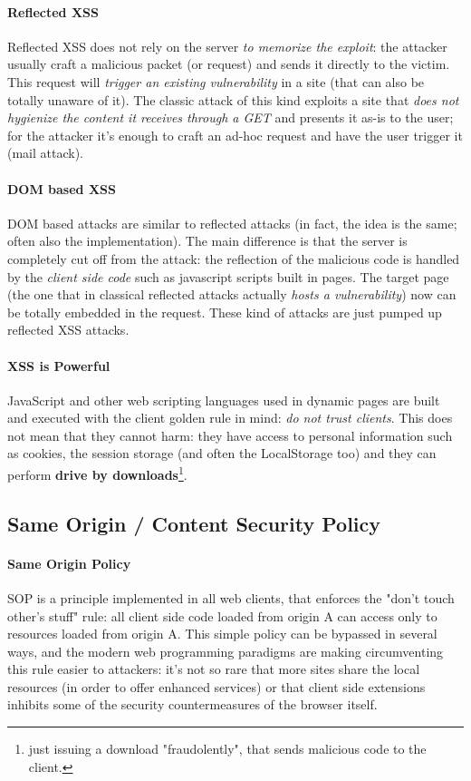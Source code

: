 \documentclass{article}
\begin{document}
				\paragraph{Reflected XSS}
					Reflected XSS does not rely on the server \emph{to memorize the exploit}: the attacker usually craft a malicious packet (or request) and sends it directly to the victim. This request will \emph{trigger an existing vulnerability} in a site (that can also be totally unaware of it). The classic attack of this kind exploits a site that \emph{does not hygienize the content it receives through a GET} and presents it as-is to the user; for the attacker it's enough to craft an ad-hoc request and have the user trigger it (mail attack).
				
				\paragraph{DOM based XSS}
					DOM based attacks are similar to reflected attacks (in fact, the idea is the same; often also the implementation). The main difference is that the server is completely cut off from the attack: the reflection of the malicious code is handled by the \emph{client side code} such as javascript scripts built in pages. The target page (the one that in classical reflected attacks actually \emph{hosts a vulnerability}) now can be totally embedded in the request. These kind of attacks are just pumped up reflected XSS attacks.
					
				\paragraph{XSS is Powerful}
					JavaScript and other web scripting languages used in dynamic pages are built and executed with the client golden rule in mind: \emph{do not trust clients}. This does not mean that they cannot harm: they have access to personal information such as cookies, the session storage (and often the LocalStorage too) and they can perform \textbf{drive by downloads}\footnote{just issuing a download "fraudolently", that sends malicious code to the client.}.
				
			\subsection{Same Origin / Content Security Policy}
				\paragraph{Same Origin Policy}
					SOP is a principle implemented in all web clients, that enforces the "don't touch other's stuff" rule: all client side code loaded from origin A can access only to resources loaded from origin A. This simple policy can be bypassed in several ways, and the modern web programming paradigms are making circumventing this rule easier to attackers: it's not so rare that more sites share the local resources (in order to offer enhanced services) or that client side extensions inhibits some of the security countermeasures of the browser itself.\\
				
\end{document}
